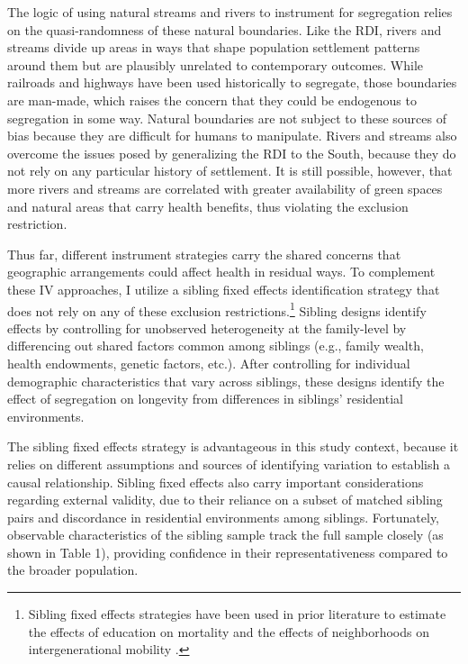 \documentclass[11pt]{article}
\begin{document}
The logic of using natural streams and rivers to instrument for segregation relies on the quasi-randomness of these natural boundaries. Like the RDI, rivers and streams divide up areas in ways that shape population settlement patterns around them but are plausibly unrelated to contemporary outcomes. While railroads and highways have been used historically to segregate, those boundaries are man-made, which raises the concern that they could be endogenous to segregation in some way. Natural boundaries are not subject to these sources of bias because they are difficult for humans to manipulate. Rivers and streams also overcome the issues posed by generalizing the RDI to the South, because they do not rely on any particular history of settlement. It is still possible, however, that more rivers and streams are correlated with greater availability of green spaces and natural areas that carry health benefits, thus violating the exclusion restriction. 

Thus far, different instrument strategies carry the shared concerns that geographic arrangements could affect health in residual ways. To complement these IV approaches, I utilize a sibling fixed effects identification strategy that does not rely on any of these exclusion restrictions.\footnote{Sibling fixed effects strategies have been used in prior literature to estimate the effects of education on mortality \citep{halpern-manners_effects_2020} and the effects of neighborhoods on intergenerational mobility \citep{chetty_impacts_2018}.} Sibling designs identify effects by controlling for unobserved heterogeneity at the family-level by differencing out shared factors common among siblings (e.g., family wealth, health endowments, genetic factors, etc.). After controlling for individual demographic characteristics that vary across siblings, these designs identify the effect of segregation on longevity from differences in siblings' residential environments.

The sibling fixed effects strategy is advantageous in this study context, because it relies on different assumptions and sources of identifying variation to establish a causal relationship. Sibling fixed effects also carry important considerations regarding external validity, due to their reliance on a subset of matched sibling pairs and discordance in residential environments among siblings. Fortunately, observable characteristics of the sibling sample track the full sample closely (as shown in Table 1), providing confidence in their representativeness compared to the broader population.
\end{document}
